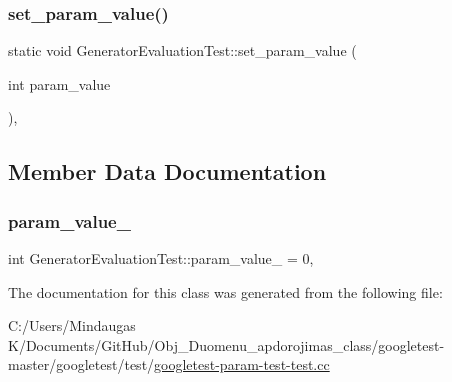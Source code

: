 \mbox{\label{class_generator_evaluation_test_ae4f5fb96577dd680d9fa1fd6c3c4af46}} 
\subsubsection{\texorpdfstring{set\_param\_value()}{set\_param\_value()}\hspace{0.1cm}{\footnotesize\ttfamily [3/3]}}
{\footnotesize\ttfamily static void Generator\+Evaluation\+Test\+::set\+\_\+param\+\_\+value (\begin{DoxyParamCaption}\item[{int}]{param\+\_\+value }\end{DoxyParamCaption})\hspace{0.3cm}{\ttfamily [inline]}, {\ttfamily [static]}}



\subsection{Member Data Documentation}
\mbox{\label{class_generator_evaluation_test_a6bae9750692a4cc4799176eada25ef99}} 
\subsubsection{\texorpdfstring{param\_value\_}{param\_value\_}}
{\footnotesize\ttfamily int Generator\+Evaluation\+Test\+::param\+\_\+value\+\_\+ = 0\hspace{0.3cm}{\ttfamily [static]}, {\ttfamily [private]}}



The documentation for this class was generated from the following file\+:\begin{DoxyCompactItemize}
\item 
C\+:/\+Users/\+Mindaugas K/\+Documents/\+Git\+Hub/\+Obj\+\_\+\+Duomenu\+\_\+apdorojimas\+\_\+class/googletest-\/master/googletest/test/\mbox{\hyperlink{googletest-master_2googletest_2test_2googletest-param-test-test_8cc}{googletest-\/param-\/test-\/test.\+cc}}\end{DoxyCompactItemize}
